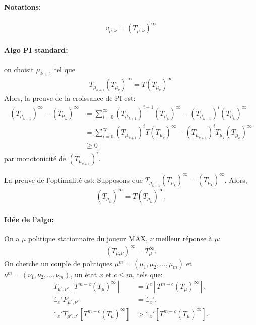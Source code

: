 \documentclass{article}
\def\1{{\mathds 1}}
\begin{document}
\paragraph{Notations:}
\begin{align}
  v_{\mu,\nu} = (T_{\mu,\nu})^\infty
\end{align}

\paragraph{Algo PI standard:} on choisit $\mu_{k+1}$ tel que
\begin{align}
 T_{\mu_{k+1}} (T_{\mu_{k}})^\infty = T (T_{\mu_{k}})^\infty
\end{align}
Alors, la preuve de la croissance de PI est:
\begin{align}
  (T_{\mu_{k+1}})^\infty - (T_{\mu_k})^\infty & = \sum_{i=0}^{\infty} (T_{\mu_{k+1}})^{i+1} (T_{\mu_k})^\infty - (T_{\mu_{k+1}})^{i} (T_{\mu_k})^\infty \\
  & = \sum_{i=0}^{\infty} (T_{\mu_{k+1}})^{i} T (T_{\mu_k})^\infty - (T_{\mu_{k+1}})^{i} T_{\mu_k} (T_{\mu_k})^\infty \\
  & \ge 0
\end{align}
par monotonicité de $(T_{\mu_{k+1}})^{i}$.

La preuve de l'optimalité est: Supposons que $T_{\mu_{k+1}} (T_{\mu_{k}})^\infty = (T_{\mu_{k}})^\infty$. Alors,
\begin{align}
  (T_{\mu_{k}})^\infty = T (T_{\mu_{k}})^\infty.
\end{align}


\def\muc{\mu^c}
\def\nuc{\nu^c}

\paragraph{Idée de l'algo:}
On a $\mu$ politique stationnaire du joueur MAX, $\nu$ meilleur réponse à $\mu$:
\begin{align}
  (T_{\mu,\nu})^\infty = T_{\mu}^\infty.
\end{align}
On cherche un couple de politiques $\mu^m = (\mu_1,\mu_2,\dots,\mu_m)$ et $\nu^m = (\nu_1,\nu_2,\dots,\nu_m)$, un état $x$ et $c \le m$, tels que:
\begin{align}
  T_{\muc,\nuc}  \left[ T^{m-c} (T_{\mu})^\infty \right] & = T^c \left[ T^{m-c} (T_{\mu})^\infty \right], \\
  \1_x' P_{\muc,\nuc} & = \1_x',\\
  \1_x' T_{\muc,\nuc} \left[ T^{m-c} (T_{\mu})^\infty \right] & > \1_x' \left[ T^{m-c} (T_{\mu})^\infty \right].
\end{align}
\end{document}
